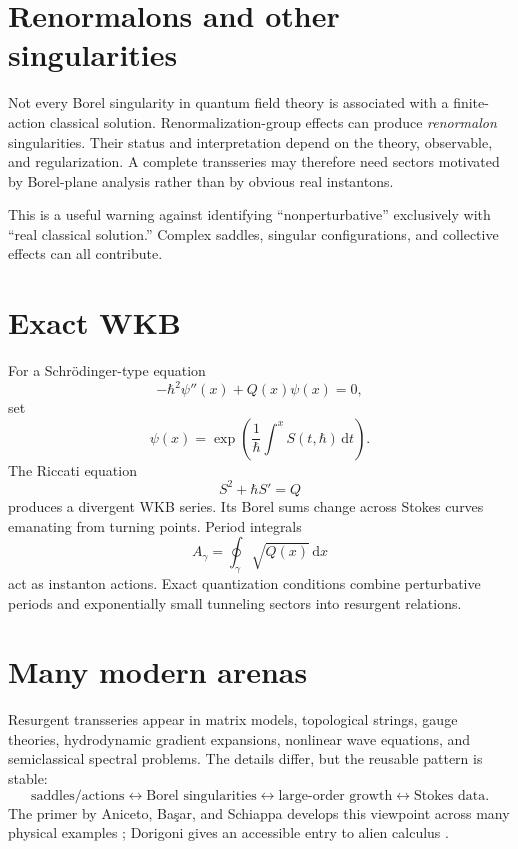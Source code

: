 \documentclass[11pt,oneside]{book}
\theoremstyle{definition}
\theoremstyle{remark}
\newcommand{\dd}{\,\mathrm{d}}
\begin{document}
\section{Renormalons and other singularities}

Not every Borel singularity in quantum field theory is associated with a finite-
action classical solution. Renormalization-group effects can produce
\emph{renormalon} singularities. Their status and interpretation depend on the
theory, observable, and regularization. A complete transseries may therefore
need sectors motivated by Borel-plane analysis rather than by obvious real
instantons.

This is a useful warning against identifying ``nonperturbative'' exclusively
with ``real classical solution.'' Complex saddles, singular configurations, and
collective effects can all contribute.

\section{Exact WKB}

For a Schr\"odinger-type equation
\begin{equation}
  -\hbar^2\psi''(x)+Q(x)\psi(x)=0,
  \label{eq:exact-wkb-equation}
\end{equation}
set
\[
  \psi(x)=\exp\!\left(\frac1\hbar\int^x S(t,\hbar)\dd t\right).
\]
The Riccati equation
\[
  S^2+\hbar S'=Q
\]
produces a divergent WKB series. Its Borel sums change across Stokes curves
emanating from turning points. Period integrals
\[
  A_\gamma=\oint_\gamma\sqrt{Q(x)}\dd x
\]
act as instanton actions. Exact quantization conditions combine perturbative
periods and exponentially small tunneling sectors into resurgent relations.

\section{Many modern arenas}

Resurgent transseries appear in matrix models, topological strings, gauge
theories, hydrodynamic gradient expansions, nonlinear wave equations, and
semiclassical spectral problems. The details differ, but the reusable pattern is
stable:
\[
  \text{saddles/actions}
  \longleftrightarrow
  \text{Borel singularities}
  \longleftrightarrow
  \text{large-order growth}
  \longleftrightarrow
  \text{Stokes data}.
\]
The primer by Aniceto, Ba\c{s}ar, and Schiappa develops this viewpoint across
many physical examples \cite{AnicetoBasarSchiappa}; Dorigoni gives an accessible
entry to alien calculus \cite{DorigoniIntro}.
\end{document}
